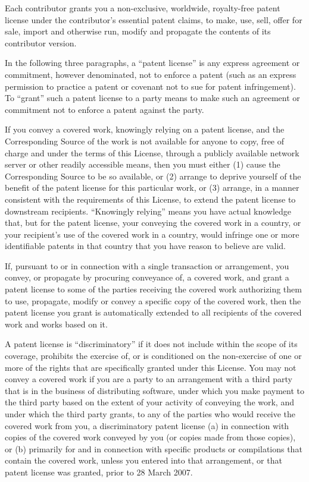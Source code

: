 Each contributor grants you a non-exclusive, worldwide, royalty-free patent license under the contributor's essential patent claims, to make, use, sell, offer for sale, import and otherwise run, modify and propagate the contents of its contributor version.

In the following three paragraphs, a “patent license” is any express agreement or commitment, however denominated, not to enforce a patent (such as an express permission to practice a patent or covenant not to sue for patent infringement). To “grant” such a patent license to a party means to make such an agreement or commitment not to enforce a patent against the party.

If you convey a covered work, knowingly relying on a patent license, and the Corresponding Source of the work is not available for anyone to copy, free of charge and under the terms of this License, through a publicly available network server or other readily accessible means, then you must either (1) cause the Corresponding Source to be so available, or (2) arrange to deprive yourself of the benefit of the patent license for this particular work, or (3) arrange, in a manner consistent with the requirements of this License, to extend the patent license to downstream recipients. “Knowingly relying” means you have actual knowledge that, but for the patent license, your conveying the covered work in a country, or your recipient's use of the covered work in a country, would infringe one or more identifiable patents in that country that you have reason to believe are valid.

If, pursuant to or in connection with a single transaction or arrangement, you convey, or propagate by procuring conveyance of, a covered work, and grant a patent license to some of the parties receiving the covered work authorizing them to use, propagate, modify or convey a specific copy of the covered work, then the patent license you grant is automatically extended to all recipients of the covered work and works based on it.

A patent license is “discriminatory” if it does not include within the scope of its coverage, prohibits the exercise of, or is conditioned on the non-exercise of one or more of the rights that are specifically granted under this License. You may not convey a covered work if you are a party to an arrangement with a third party that is in the business of distributing software, under which you make payment to the third party based on the extent of your activity of conveying the work, and under which the third party grants, to any of the parties who would receive the covered work from you, a discriminatory patent license (a) in connection with copies of the covered work conveyed by you (or copies made from those copies), or (b) primarily for and in connection with specific products or compilations that contain the covered work, unless you entered into that arrangement, or that patent license was granted, prior to 28 March 2007.

